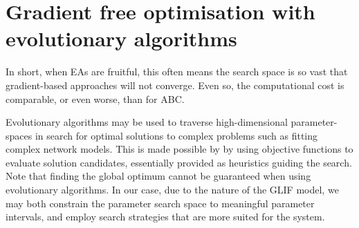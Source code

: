 \documentclass[mphil,deptreport,ai]{infthesis} %
\begin{document}
\section{Gradient free optimisation with evolutionary algorithms}

In short, when EAs are fruitful, this often means the search space is so vast that gradient-based approaches will not converge.
Even so, the computational cost is comparable, or even worse, than for ABC.




Evolutionary algorithms may be used to traverse high-dimensional parameter-spaces in search for optimal solutions to complex problems such as fitting complex network models.
This is made possible by by using objective functions to evaluate solution candidates, essentially provided as heuristics guiding the search. Note that finding the global optimum cannot be guaranteed when using evolutionary algorithms.
In our case, due to the nature of the GLIF model, we may both constrain the parameter search space to meaningful parameter intervals, and employ search strategies that are more suited for the system.
\end{document}
